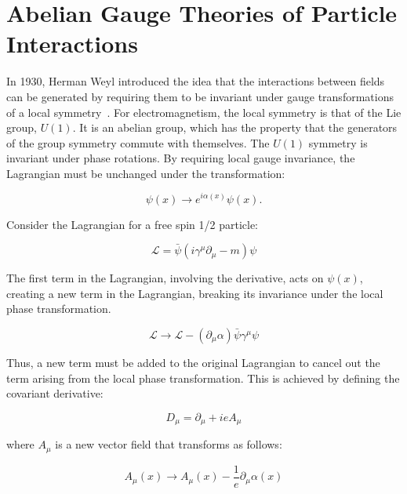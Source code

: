 \section{Abelian Gauge Theories of Particle Interactions}
\label{abelian_gauge_theory_overview}

\par In 1930, Herman Weyl introduced the idea that the interactions
between fields can be generated by requiring them to be invariant
under gauge transformations of a local symmetry~\cite{Weyl}.  For
electromagnetism, the local symmetry is that of the Lie group,
$U(1)$.  It is an abelian group, which has the property that the
generators of the group symmetry commute with themselves. 
The $U(1)$ symmetry is invariant under phase rotations.  By requiring
local gauge invariance, the Lagrangian must be unchanged under the transformation:

\begin{equation}\label{eq:u1_psi_transformation}
\psi(x) \rightarrow e^{i\alpha(x)}\psi(x).
\end{equation}

Consider the Lagrangian for a free spin 1/2 particle: 

\begin{equation}\label{eq:dirac_lagrangian}
\mathcal{L} = \bar{\psi}(i\gamma^{\mu}\partial_{\mu} - m)\psi
\end{equation}

\noindent The first term in the Lagrangian, involving the derivative,
acts on $\psi(x)$, creating a new term in the Lagrangian, breaking
its invariance under the local phase transformation.  

\begin{equation}\label{eq:u1_lagrangian_transformation}
\mathcal{L}\rightarrow\mathcal{L} -
(\partial_{\mu}\alpha)\bar{\psi}\gamma^{\mu}\psi
\end{equation}

\noindent Thus, a new term must be added to the original Lagrangian to cancel
out the term arising from the local phase transformation.  This is
achieved by defining the covariant derivative:

\begin{equation}\label{eq:covariant_derivative_em}
D_{\mu} = \partial_{\mu} + ieA_{\mu}
\end{equation} 

\noindent where $A_{\mu}$ is a new vector field that transforms as follows:

\begin{equation}\label{eq:u1_Afield_transformation}
A_{\mu}(x) \rightarrow A_{\mu}(x) - \frac{1}{e}\partial_{\mu}\alpha(x)
\end{equation}

